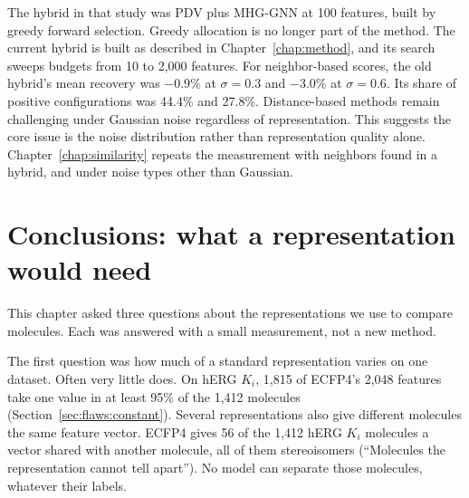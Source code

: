 The hybrid in that study was PDV plus MHG-GNN at 100 features, built by greedy forward selection. Greedy allocation is no longer part of the method. The current hybrid is built as described in Chapter~\ref{chap:method}, and its search sweeps budgets from 10 to 2,000 features. For neighbor-based scores, the old hybrid's mean recovery was $-0.9\%$ at $\sigma = 0.3$ and $-3.0\%$ at $\sigma = 0.6$. Its share of positive configurations was 44.4\% and 27.8\%. Distance-based methods remain challenging under Gaussian noise regardless of representation. This suggests the core issue is the noise distribution rather than representation quality alone. Chapter~\ref{chap:similarity} repeats the measurement with neighbors found in a hybrid, and under noise types other than Gaussian.

\section{Conclusions: what a representation would need}
This chapter asked three questions about the representations we use to compare molecules. Each was answered with a small measurement, not a new method.

The first question was how much of a standard representation varies on one dataset. Often very little does. On hERG $K_i$, 1,815 of ECFP4's 2,048 features take one value in at least 95\% of the 1,412 molecules (Section~\ref{sec:flaws:constant}). Several representations also give different molecules the same feature vector. ECFP4 gives 56 of the 1,412 hERG $K_i$ molecules a vector shared with another molecule, all of them stereoisomers (``Molecules the representation cannot tell apart''). No model can separate those molecules, whatever their labels.

